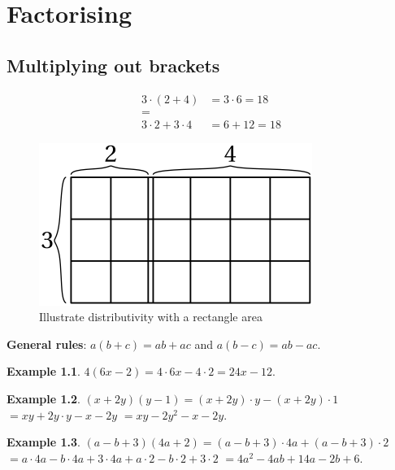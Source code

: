 \documentclass[
  12pt,
  oneside]{book}
\theoremstyle{definition}
\theoremstyle{definition}
\newtheorem{example}{Example}[chapter]
\theoremstyle{definition}
\theoremstyle{definition}
\theoremstyle{remark}
\begin{document}
\hypertarget{factorising}{%
\chapter{Factorising}\label{factorising}}

\hypertarget{multiplying-out-brackets}{%
\section{Multiplying out brackets}\label{multiplying-out-brackets}}

\begin{align*}
3\cdot(2+4) &= 3\cdot 6 = 18\\
=\quad\quad\\
3\cdot2 + 3\cdot 4 &= 6+12 = 18
\end{align*}

\begin{figure}

{\centering \includegraphics{t02-distrib} 

}

\caption{Illustrate distributivity with a rectangle area}\label{fig:unnamed-chunk-8}
\end{figure}

\textbf{General rules}: \(a(b+c)=ab+ac\) and \(a(b-c) = ab-ac\).

\begin{example}
\(4(6x-2)=4\cdot 6x - 4\cdot 2 = 24x-12\).
\end{example}

\begin{example}
\((x+2y)(y-1)=(x+2y)\cdot y - (x+2y)\cdot 1\) \(= xy+2y\cdot y - x -2y\) \(= xy-2y^2-x-2y\).
\end{example}

\begin{example}
\((a-b+3)(4a+2)=(a-b+3)\cdot4a + (a-b+3)\cdot 2\) \(=a\cdot 4a - b\cdot 4a + 3\cdot 4a + a\cdot 2 - b\cdot 2 + 3\cdot 2\) \(= 4a^2 - 4ab + 14a - 2b+6\).
\end{example}
\end{document}
